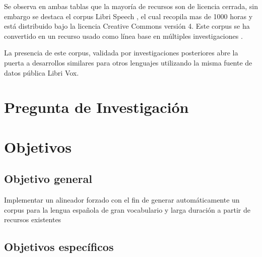 

Se observa en ambas tablas que la mayoría de recursos son de licencia cerrada, sin embargo se destaca el corpus Libri Speech \cite{LIBRISPEECH}, el cual recopila mas de 1000 horas y está distribuido bajo la licencia Creative Commons versión 4. Este corpus se ha convertido en un recurso usado como línea base en múltiples investigaciones \cite{libribox_benchmark1,librilight,libribox_benchmark3}. 

La presencia de este corpus, validada por investigaciones posteriores abre la puerta a desarrollos similares para otros lenguajes utilizando la misma fuente de datos pública Libri Vox. 


\section{Pregunta de Investigación}



\section{Objetivos}


\subsection{Objetivo general}

Implementar un alineador forzado con el fin de generar automáticamente un corpus para la lengua española de gran vocabulario y larga duración a partir de recursos existentes

\subsection{Objetivos específicos}

